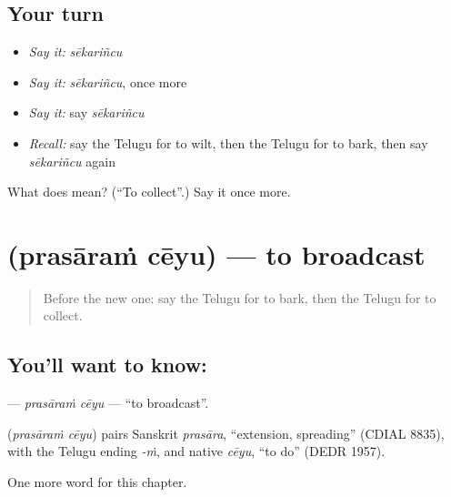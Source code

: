 \subsection*{Your turn}
\begin{itemize}
\raggedright
  \item \emph{Say it:} \emph{sēkariñcu}
  \item \emph{Say it:} \emph{sēkariñcu}, once more
  \item \emph{Say it:} say \emph{sēkariñcu}
  \item \emph{Recall:} say the Telugu for to wilt, then the Telugu for to bark, then say \emph{sēkariñcu} again
\end{itemize}

\begin{tcolorbox}[breakable,colback=teal!4,colframe=teal!35!black,title={Before you move on}]
What does  mean? (\textquotedblleft{}To collect\textquotedblright{}.) Say it once more.
\end{tcolorbox}
\section[\texorpdfstring{\te{ప్రసారం} \te{చేయు} (prasāraṁ cēyu)}{ప్రసారం చేయు (prasāraṁ cēyu)}]{  (prasāraṁ cēyu) — to broadcast}

\label{lesson:TE-C245-prasaram-ceyu}



\begin{quote}
Before the new one: say the Telugu for to bark, then the Telugu for to collect.
\end{quote}

\subsection*{You'll want to know:  }
\textbf{ } — \emph{prasāraṁ cēyu} — \textquotedblleft{}to broadcast\textquotedblright{}.

\begin{cousinweb}
\textbf{ } (\emph{prasāraṁ cēyu}) pairs Sanskrit \emph{prasāra}, \textquotedblleft{}extension, spreading\textquotedblright{} (CDIAL 8835), with the Telugu ending \emph{-ṁ}, and native \emph{cēyu}, \textquotedblleft{}to do\textquotedblright{} (DEDR 1957).
\end{cousinweb}

\begin{grammarlens}[title={What you've built}]
One more word for this chapter.
\end{grammarlens}

